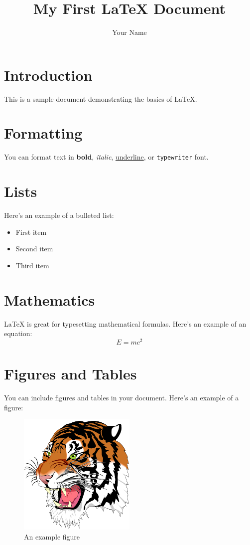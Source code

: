 \documentclass{article}
\title{My First LaTeX Document}
\author{Your Name}
\begin{document}
\maketitle

\section{Introduction}
This is a sample document demonstrating the basics of LaTeX.

\section{Formatting}
You can format text in \textbf{bold}, \textit{italic}, \underline{underline}, or \texttt{typewriter} font.

\section{Lists}
Here's an example of a bulleted list:
\begin{itemize}
    \item First item
    \item Second item
    \item Third item
\end{itemize}

\section{Mathematics}
LaTeX is great for typesetting mathematical formulas. Here's an example of an equation:
\begin{equation}
    E = mc^2
\end{equation}

\section{Figures and Tables}
You can include figures and tables in your document. Here's an example of a figure:
\begin{figure}[H]
    \centering
    \includegraphics[width=0.5\textwidth]{example-image}
    \caption{An example figure}
    \label{fig:example}
\end{figure}
\end{document}
